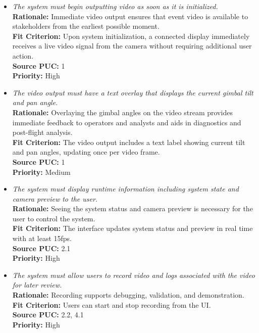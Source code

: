 \documentclass[12pt]{article}
\begin{document}
\begin{itemize}[leftmargin=*]
  \item[FR-8] \emph{The system must begin outputting video as soon as it is
          initialized.}\\[2mm]
        \textbf{Rationale:} Immediate video output ensures that event video is available to stakeholders from the earliest possible moment.\\
        \textbf{Fit Criterion:} Upon system initialization, a connected display immediately receives a live video signal from the camera without requiring additional user action.\\
        \textbf{Source PUC:} 1 \\
        \textbf{Priority:} High

  \item[FR-9] \emph{The video output must have a text overlay that displays the current
          gimbal tilt and pan angle.}\\[2mm]
        \textbf{Rationale:} Overlaying the gimbal angles on the video stream provides immediate feedback to operators and analysts and aids in diagnostics and post-flight analysis.\\
        \textbf{Fit Criterion:} The video output includes a text label showing current tilt and pan angles, updating once per video frame.\\
        \textbf{Source PUC:} 1 \\
        \textbf{Priority:} Medium

  \item[FR-10] \emph{The system must display runtime information including system state
          and camera preview to the user.}\\[2mm]
        \textbf{Rationale:} Seeing the system status and camera preview is necessary for the user to control the system.\\
        \textbf{Fit Criterion:} The interface updates system status and preview in real time with at least 15fps.\\
        \textbf{Source PUC:} 2.1 \\
        \textbf{Priority:} High

  \item[FR-11] \emph{The system must allow users to record video and logs associated
          with the video for later review.}\\[2mm]
        \textbf{Rationale:} Recording supports debugging, validation, and demonstration.\\
        \textbf{Fit Criterion:} Users can start and stop recording from the UI.\\
        \textbf{Source PUC:} 2.2, 4.1 \\
        \textbf{Priority:} High


\end{itemize}
\end{document}
